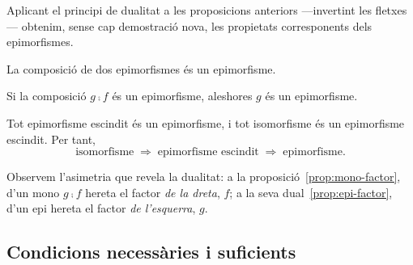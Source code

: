 Aplicant el principi de dualitat a les proposicions anteriors ---invertint les fletxes--- obtenim, sense cap demostració nova, les propietats corresponents dels epimorfismes.

\begin{proposicio}\label{prop:epi-comp}
La composició de dos epimorfismes és un epimorfisme.
\end{proposicio}

\begin{proposicio}\label{prop:epi-factor}
Si la composició $g\comp f$ és un epimorfisme, aleshores $g$ és un epimorfisme.
\end{proposicio}

\begin{proposicio}\label{prop:iso-sec-epi}
Tot epimorfisme escindit és un epimorfisme, i tot isomorfisme és un epimorfisme escindit. Per tant,
\[
\text{isomorfisme} \;\Longrightarrow\; \text{epimorfisme escindit} \;\Longrightarrow\; \text{epimorfisme}.
\]
\end{proposicio}

Observem l'asimetria que revela la dualitat: a la proposició~\ref{prop:mono-factor}, d'un mono $g\comp f$ hereta el factor \emph{de la dreta}, $f$; a la seva dual~\ref{prop:epi-factor}, d'un epi hereta el factor \emph{de l'esquerra}, $g$.

\subsection{Condicions necessàries i suficients}

